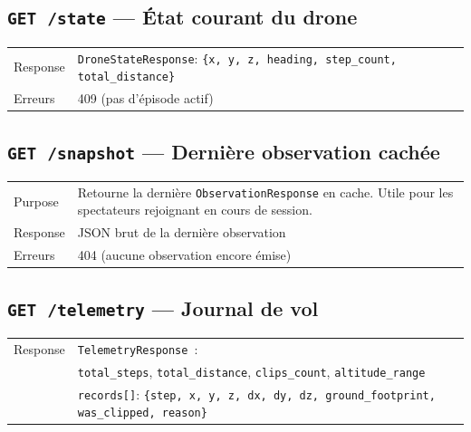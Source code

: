 \documentclass[a4paper, 11pt, french]{article}
\newcommand{\code}[1]{\texttt{#1}}
\newcommand{\apiendpoint}[2]{\texorpdfstring{\texttt{#1}~\texttt{#2}}{#1 #2}}
\begin{document}
\subsection{\apiendpoint{GET}{/state} --- État courant du drone}

\begin{table}[H]
\centering\small
\begin{tabular}{lp{10cm}}
\toprule
Response & \code{DroneStateResponse}: \code{\{x, y, z, heading, step\_count,
          total\_distance\}} \\
Erreurs & 409 (pas d'épisode actif) \\
\bottomrule
\end{tabular}
\end{table}

\subsection{\apiendpoint{GET}{/snapshot} --- Dernière observation cachée}

\begin{table}[H]
\centering\small
\begin{tabular}{lp{10cm}}
\toprule
Purpose & Retourne la dernière \code{ObservationResponse} en cache. Utile pour les
          spectateurs rejoignant en cours de session. \\
Response & JSON brut de la dernière observation \\
Erreurs & 404 (aucune observation encore émise) \\
\bottomrule
\end{tabular}
\end{table}

\subsection{\apiendpoint{GET}{/telemetry} --- Journal de vol}

\begin{table}[H]
\centering\small
\begin{tabular}{lp{10cm}}
\toprule
Response & \code{TelemetryResponse}~: \\
& \code{total\_steps}, \code{total\_distance}, \code{clips\_count},
  \code{altitude\_range} \\
& \code{records[]}: \code{\{step, x, y, z, dx, dy, dz,
  ground\_footprint, was\_clipped, reason\}} \\
\bottomrule
\end{tabular}
\end{table}
\end{document}
